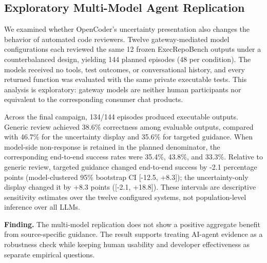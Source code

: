 \subsection{Exploratory Multi-Model Agent Replication}
\label{sec:gateway-agent-replication}

We examined whether OpenCoder's uncertainty presentation also changes the
behavior of automated code reviewers. Twelve gateway-mediated model
configurations each reviewed the same 12 frozen ExecRepoBench outputs under a
counterbalanced design, yielding 144 planned episodes (48 per condition). The
models received no tools, test outcomes, or conversational history, and every
returned function was evaluated with the same private executable tests. This
analysis is exploratory: gateway models are neither human participants nor
equivalent to the corresponding consumer chat products.

Across the final campaign, 134/144
episodes produced executable outputs. Generic review achieved
38.6\% correctness among evaluable
outputs, compared with 46.7\% for the
uncertainty display and 35.6\% for
targeted guidance. When model-side non-response is retained in the planned
denominator, the corresponding end-to-end success rates were
35.4\%,
43.8\%, and
33.3\%. Relative to generic review,
targeted guidance changed end-to-end success by
-2.1 percentage points (model-clustered
95\% bootstrap CI [-12.5,
+8.3]); the uncertainty-only
display changed it by +8.3 points
([-2.1,
+18.8]). These intervals are
descriptive sensitivity estimates over the twelve configured systems, not
population-level inference over all LLMs.

\noindent\textbf{Finding.}
The multi-model replication does not show a positive aggregate benefit from source-specific guidance. The result supports treating
AI-agent evidence as a robustness check while keeping human usability and
developer effectiveness as separate empirical questions.
